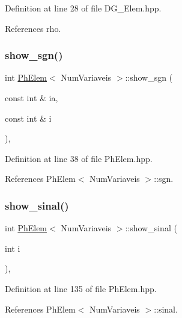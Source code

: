 Definition at line 28 of file D\+G\+\_\+\+Elem.\+hpp.



References rho.

\mbox{\label{classPhElem_ab271550e1373e11cb0b1f62d3e1ea428}} 
\subsubsection{\texorpdfstring{show\+\_\+sgn()}{show\_sgn()}}
{\footnotesize\ttfamily int \hyperlink{classPhElem}{Ph\+Elem}$<$ Num\+Variaveis $>$\+::show\+\_\+sgn (\begin{DoxyParamCaption}\item[{const int \&}]{ia,  }\item[{const int \&}]{i }\end{DoxyParamCaption})\hspace{0.3cm}{\ttfamily [inline]}, {\ttfamily [inherited]}}



Definition at line 38 of file Ph\+Elem.\+hpp.



References Ph\+Elem$<$ Num\+Variaveis $>$\+::sgn.

\mbox{\label{classPhElem_a47dc705efd50a4484bf407bce4a5e010}} 
\subsubsection{\texorpdfstring{show\+\_\+sinal()}{show\_sinal()}}
{\footnotesize\ttfamily int \hyperlink{classPhElem}{Ph\+Elem}$<$ Num\+Variaveis $>$\+::show\+\_\+sinal (\begin{DoxyParamCaption}\item[{int}]{i }\end{DoxyParamCaption})\hspace{0.3cm}{\ttfamily [inline]}, {\ttfamily [inherited]}}



Definition at line 135 of file Ph\+Elem.\+hpp.



References Ph\+Elem$<$ Num\+Variaveis $>$\+::sinal.

